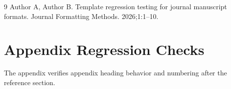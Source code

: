 \begin{thebibliography}{9}
Author A, Author B. Template regression testing for journal manuscript formats. Journal Formatting Methods. 2026;1:1--10.
\end{thebibliography}

\appendix
\section{Appendix Regression Checks}
The appendix verifies appendix heading behavior and numbering after the reference section.
